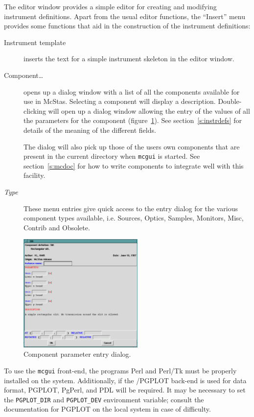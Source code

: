 The editor window provides a simple editor for creating and modifying
instrument definitions. Apart from the usual editor functions, the
``Insert'' menu provides some functions that aid in the construction of
the instrument definitions:
\begin{description}
\item[Instrument template] inserts the text for a simple instrument
  skeleton in the editor window.
\item[Component\ldots] opens up a dialog window with a list of all
  the components available for use in McStas. Selecting a component will
  display a description. Double-clicking will open up a dialog window
  allowing the entry of the values of all the parameters for the
  component (figure~\ref{f:comp_dialog}). See section~\ref{s:instrdefs}
  for details of the meaning of the different fields.

The dialog will also pick up those of the users own components that are
  present in the current directory when \verb+mcgui+ is started. See
  section~\ref{s:mcdoc} for how to write components to integrate well
  with this facility.
\item[\textit{Type}] These menu entries give quick access to the entry
  dialog for the various component types available, i.e. Sources,
  Optics, Samples, Monitors, Misc, Contrib and Obsolete.
\end{description}
\begin{figure}[tbp]
  \begin{center}
    \includegraphics[width=0.55\textwidth]{figures/comp_dialog.eps}
    \caption{Component parameter entry dialog.}
    \label{f:comp_dialog}
  \end{center}
\end{figure}

To use the \verb+mcgui+ front-end, the programs Perl and Perl/Tk must
be properly installed on the system. Additionally, if the \MCS /PGPLOT
back-end is used for data format, PGPLOT, PgPerl, and PDL will be
required.  It may be necessary to set the
\verb+PGPLOT_DIR+ and \verb+PGPLOT_DEV+ environment variable; consult
the documentation for PGPLOT on the local system in case of
difficulty. 

